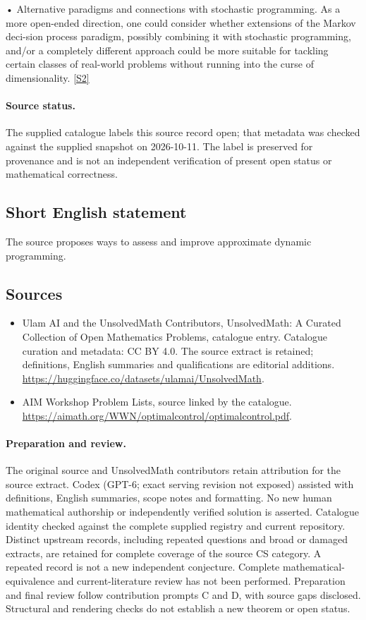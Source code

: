 \documentclass[11pt]{article}
\newcommand{\sref}[2]{\hyperlink{source:#1:#2}{[S#2]}}
\begin{document}
• Alternative paradigms and connections with stochastic programming. As a more open-ended direction, one could consider whether extensions of the Markov deci-sion process paradigm, possibly combining it with stochastic programming, and/or a completely different approach could be more suitable for tackling certain classes of real-world problems without running into the curse of dimensionality. \sref{statement}{2}
\paragraph{Source status.}
The supplied catalogue labels this source record open; that metadata was checked against the supplied snapshot on 2026-10-11. The label is preserved for provenance and is not an independent verification of present open status or mathematical correctness.
\subsection{Short English statement}
The source proposes ways to assess and improve approximate dynamic programming.
\subsection{Sources}
\begin{itemize}
\item[\hypertarget{source:statement:1}{S1}] Ulam AI and the UnsolvedMath Contributors, UnsolvedMath: A Curated Collection of Open Mathematics Problems, catalogue entry. Catalogue curation and metadata: CC BY 4.0. The source extract is retained; definitions, English summaries and qualifications are editorial additions.
\url{https://huggingface.co/datasets/ulamai/UnsolvedMath}.
\item[\hypertarget{source:statement:2}{S2}] AIM Workshop Problem Lists, source linked by the catalogue.
\url{https://aimath.org/WWN/optimalcontrol/optimalcontrol.pdf}.
\end{itemize}
\paragraph{Preparation and review.}
The original source and UnsolvedMath contributors retain attribution for the source extract. Codex (GPT-6; exact serving revision not exposed) assisted with definitions, English summaries, scope notes and formatting. No new human mathematical authorship or independently verified solution is asserted. Catalogue identity checked against the complete supplied registry and current repository. Distinct upstream records, including repeated questions and broad or damaged extracts, are retained for complete coverage of the source CS category. A repeated record is not a new independent conjecture. Complete mathematical-equivalence and current-literature review has not been performed. Preparation and final review follow contribution prompts C and D, with source gaps disclosed. Structural and rendering checks do not establish a new theorem or open status.
\label{end:statement}
\end{document}
